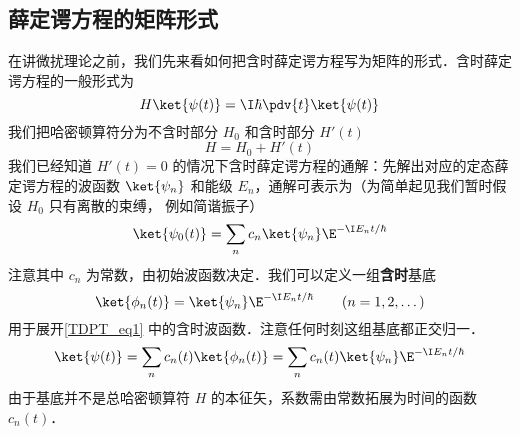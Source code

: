 

\subsection{薛定谔方程的矩阵形式}
在讲微扰理论之前，我们先来看如何把含时薛定谔方程写为矩阵的形式．含时薛定谔方程的一般形式为
\begin{equation}\label{TDPT_eq1}
H \ket{\psi(t)} = \I\hbar \pdv{t} \ket{\psi(t)}
\end{equation}
我们把哈密顿算符分为不含时部分 $H_0$ 和含时部分 $H'(t)$
\begin{equation}
H = H_0 + H'(t)
\end{equation}
我们已经知道 %
$H'(t) = 0$ 的情况下含时薛定谔方程的通解：先解出对应的定态薛定谔方程的波函数 $\ket{\psi_n}$ 和能级 $E_n$，通解可表示为（为简单起见我们暂时假设 $H_0$ 只有离散的束缚， 例如简谐振子）
\begin{equation}
\ket{\psi_0(t)} = \sum_n c_n \ket{\psi_n} \E^{-\I E_n t/\hbar}
\end{equation}
注意其中 $c_n$ 为常数，由初始波函数决定．我们可以定义一组\textbf{含时}基底
\begin{equation}
\ket{\phi_n(t)} = \ket{\psi_n} \E^{-\I E_n t/\hbar} \qquad (n = 1, 2, \dots)
\end{equation}
用于展开\autoref{TDPT_eq1} 中的含时波函数．注意任何时刻这组基底都正交归一．
\begin{equation}
\ket{\psi(t)} = \sum_n c_n(t) \ket{\phi_n(t)} = \sum_n c_n(t) \ket{\psi_n} \E^{-\I E_n t/\hbar}
\end{equation}
由于基底并不是总哈密顿算符 $H$ 的本征矢，系数需由常数拓展为时间的函数 $c_n(t)$．

